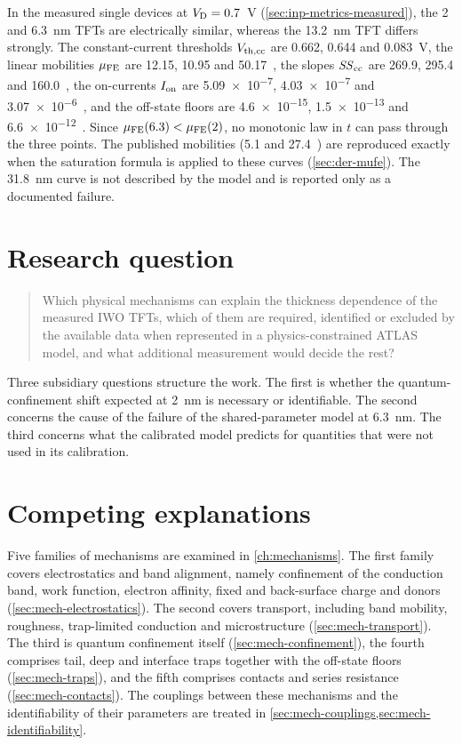 In the measured single devices at $V_{\mathrm{D}} = 0.7$~V (\cref{sec:inp-metrics-measured}), the 2 and 6.3~nm TFTs are electrically similar, whereas the 13.2~nm TFT differs strongly. The constant-current thresholds $V_{\mathrm{th,cc}}$ are 0.662, 0.644 and 0.083~V, the linear mobilities $\mu_{\mathrm{FE}}$ are 12.15, 10.95 and 50.17~\cmVs, the slopes $\mathit{SS}_{\mathrm{cc}}$ are 269.9, 295.4 and 160.0~\mVdec, the on-currents $I_{\mathrm{on}}$ are \SI{5.09e-7}{}, \SI{4.03e-7}{} and \SI{3.07e-6}{}~\Aum, and the off-state floors are \SI{4.6e-15}{}, \SI{1.5e-13}{} and \SI{6.6e-12}{}~\Aum. Since $\mu_{\mathrm{FE}}(6.3) < \mu_{\mathrm{FE}}(2)$, no monotonic law in $t$ can pass through the three points. The published mobilities (5.1 and 27.4~\cmVs) are reproduced exactly when the saturation formula is applied to these curves (\cref{sec:der-mufe}). The 31.8~nm curve is not described by the model and is reported only as a documented failure.

\section{Research question}\label{sec:intro-question}

\begin{quote}
Which physical mechanisms can explain the thickness dependence of the measured IWO TFTs, which of them are required, identified or excluded by the available data when represented in a physics-constrained ATLAS model, and what additional measurement would decide the rest?
\end{quote}
Three subsidiary questions structure the work. The first is whether the quantum-confinement shift expected at 2~nm is necessary or identifiable. The second concerns the cause of the failure of the shared-parameter model at 6.3~nm. The third concerns what the calibrated model predicts for quantities that were not used in its calibration.

\section{Competing explanations}\label{sec:intro-mechanisms}

Five families of mechanisms are examined in \cref{ch:mechanisms}. The first family covers electrostatics and band alignment, namely confinement of the conduction band, work function, electron affinity, fixed and back-surface charge and donors (\cref{sec:mech-electrostatics}). The second covers transport, including band mobility, roughness, trap-limited conduction and microstructure (\cref{sec:mech-transport}). The third is quantum confinement itself (\cref{sec:mech-confinement}), the fourth comprises tail, deep and interface traps together with the off-state floors (\cref{sec:mech-traps}), and the fifth comprises contacts and series resistance (\cref{sec:mech-contacts}). The couplings between these mechanisms and the identifiability of their parameters are treated in \cref{sec:mech-couplings,sec:mech-identifiability}.

